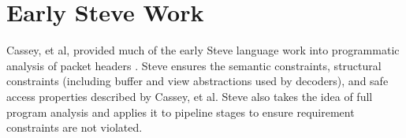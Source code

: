%



\section{Early Steve Work}

Cassey, et al, provided much of the early Steve language work into programmatic
analysis of packet headers \cite{wripe}. Steve ensures the semantic constraints,
structural constraints (including buffer and view abstractions used by decoders), and 
safe access properties described by Cassey, et al. Steve also takes the idea
of full program analysis and applies it to pipeline stages to ensure requirement
constraints are not violated.

